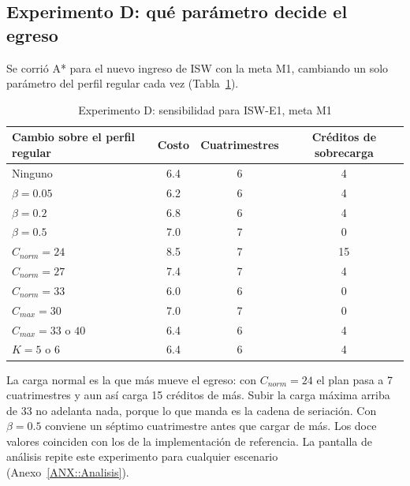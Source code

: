 \subsection{Experimento D: qué parámetro decide el egreso}
Se corrió A* para el nuevo ingreso de ISW con la meta M1, cambiando un solo parámetro del perfil regular cada vez (Tabla~\ref{TAB::ExpD}).

\begin{table}[H]
  \begin{center}
    \caption{Experimento D: sensibilidad para ISW-E1, meta M1}
    \label{TAB::ExpD}
    \begin{tabular}{|| l | c | c | c ||}
        \hline
        Cambio sobre el perfil regular & Costo & Cuatrimestres & Créditos de sobrecarga \\ [0.5ex]
        \hline\hline
        Ninguno & 6.4 & 6 & 4 \\
        \hline
        $\beta = 0.05$ & 6.2 & 6 & 4 \\
        \hline
        $\beta = 0.2$ & 6.8 & 6 & 4 \\
        \hline
        $\beta = 0.5$ & 7.0 & 7 & 0 \\
        \hline
        $C_{norm} = 24$ & 8.5 & 7 & 15 \\
        \hline
        $C_{norm} = 27$ & 7.4 & 7 & 4 \\
        \hline
        $C_{norm} = 33$ & 6.0 & 6 & 0 \\
        \hline
        $C_{max} = 30$ & 7.0 & 7 & 0 \\
        \hline
        $C_{max} = 33$ o $40$ & 6.4 & 6 & 4 \\
        \hline
        $K = 5$ o $6$ & 6.4 & 6 & 4 \\
        \hline
    \end{tabular}
  \end{center}
\end{table}

La carga normal es la que más mueve el egreso: con $C_{norm} = 24$ el plan pasa a 7 cuatrimestres y aun así carga 15 créditos de más. Subir la carga máxima arriba de 33 no adelanta nada, porque lo que manda es la cadena de seriación. Con $\beta = 0.5$ conviene un séptimo cuatrimestre antes que cargar de más. Los doce valores coinciden con los de la implementación de referencia. La pantalla de análisis repite este experimento para cualquier escenario (Anexo~\ref{ANX::Analisis}).
